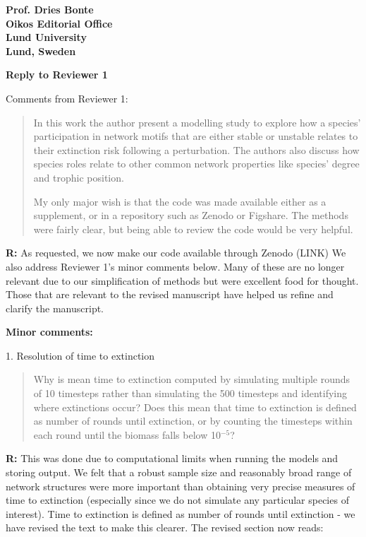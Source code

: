 \documentclass[12pt]{letter}
\begin{document}
\begin{letter}{\bf Prof. Dries Bonte\\
Oikos Editorial Office \\
Lund University \\
Lund, Sweden}
\clearpage

{\large\textbf{Reply to Reviewer 1}} 

Comments from Reviewer 1:
    \begin{quotation}
      In this work the author present a modelling study to explore how a species' participation in network motifs that are either stable or unstable relates to their extinction risk following a perturbation. The authors also discuss how species roles relate to other common network properties like species' degree and trophic position. 
    
      My only major wish is that the code was made available either as a supplement, or in a repository such as Zenodo or Figshare. The methods were fairly clear, but being able to review the code would be very helpful.

    \end{quotation}

\textbf{R:} As requested, we now make our code available through Zenodo (LINK) We also address Reviewer 1's minor comments below. Many of these are no longer relevant due to our simplification of methods but were excellent food for thought. Those that are relevant to the revised manuscript have helped us refine and clarify the manuscript.



  \textbf{Minor comments:}

  1. Resolution of time to extinction

    \begin{quotation}
    Why is mean time to extinction computed by simulating multiple rounds of 10 timesteps rather than simulating the 500 timesteps and identifying where extinctions occur? Does this mean that time to extinction is defined as number of rounds until extinction, or by counting the timesteps within each round until the biomass falls below 10$^{-5}$? 
    \end{quotation}

    \textbf{R:} This was done due to computational limits when running the models and storing output. We felt that a robust sample size and reasonably broad range of network structures were more important than obtaining very precise measures of time to extinction (especially since we do not simulate any particular species of interest). Time to extinction is defined as number of rounds until extinction - we have revised the text to make this clearer. The revised section now reads:

    \begin{quotation}


\end{quotation}
\end{letter}
\end{document}
